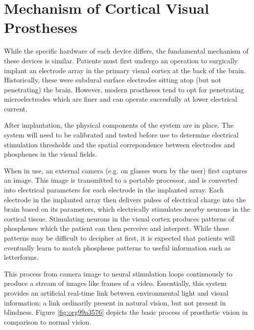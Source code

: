 \documentclass[a4paper,11pt,openany]{book}
\begin{document}
\section*{Mechanism of Cortical Visual Prostheses}
\label{sec:orgef7e32e}

While the specific hardware of each device differs, the fundamental mechanism of these devices is similar.
Patients must first undergo an operation to surgically implant an electrode array in the primary visual cortex at the back of the brain. \cite{lewis_restoration_2015}
Historically, these were subdural surface electrodes sitting atop (but not penetrating) the brain. \cite{brindley_sensations_1968,dobelle_phosphenes_1974}
However, modern prostheses tend to opt for penetrating microelectrodes \cite{lowery_monash_2017,troyk_intracortical_2017,fernandez_cortivis_2017} which are finer and can operate succesfully at lower electrical current. \cite{bak_visual_1990,schmidt_feasibility_1996}

After implantation, the physical components of the system are in place.
The system will need to be calibrated and tested before use to determine electrical stimulation thresholds and the spatial correpondence between electrodes and phosphenes in the visual fields. \cite{lowery_restoration_2015,fernandez_cortivis_2017}

When in use, an external camera (e.g. on glasses worn by the user) first captures an image. \cite{lowery_monash_2017,lewis_restoration_2015}
This image is transmitted to a portable processor, and is converted into electrical parameters for each electrode in the implanted array.
Each electrode in the implanted array then delivers pulses of electrical charge into the brain based on its parameters, which electrically stimulates nearby neurons in the cortical tissue.
Stimulating neurons in the visual cortex produces patterns of phosphenes which the patient can then perceive and interpret. \cite{brindley_sensations_1968,dobelle_phosphenes_1974,bak_visual_1990}
While these patterns may be difficult to decipher at first, it is expected that patients will eventually learn to match phosphene patterns to useful information such as letterforms. \cite{fernandez_cortivis_2017}

This process from camera image to neural stimulation loops continuously to produce a stream of images like frames of a video.
Essentially, this system provides an artificial real-time link between environmental light and visual information; a link ordinarily present in natural vision, but not present in blindness.
Figure \ref{fig:org99a3576} depicts the basic process of prosthetic vision in comparison to normal vision.
\end{document}
